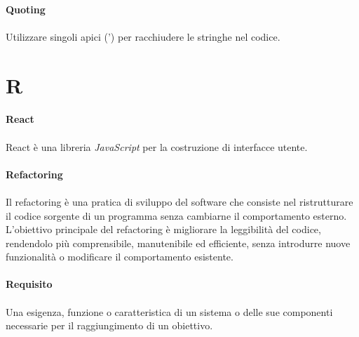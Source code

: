 \documentclass[10pt, a4paper]{article}
\begin{document}
\paragraph{Quoting}\noindent\hrulefill
\paragraph{}Utilizzare singoli apici (') per racchiudere le stringhe nel codice.


\newpage
\section{R}
\vspace{2em}
\paragraph{React}\noindent\hrulefill
\paragraph{}React è una libreria \textit{JavaScript\pg} per la costruzione di interfacce utente.

\vspace{2em}
\paragraph{Refactoring}\noindent\hrulefill
\paragraph{}Il refactoring è una pratica di sviluppo del software che consiste nel ristrutturare il codice sorgente di un programma senza cambiarne il comportamento esterno. L'obiettivo principale del refactoring è migliorare la leggibilità del codice, rendendolo più comprensibile, manutenibile ed efficiente, senza introdurre nuove funzionalità o modificare il comportamento esistente.


\vspace{2em}
\paragraph{Requisito}\noindent\hrulefill
\paragraph{}Una esigenza, funzione o caratteristica di un sistema o delle sue componenti necessarie per il raggiungimento di un obiettivo. 
\end{document}
